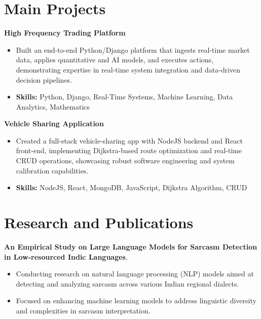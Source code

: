 \documentclass[a4paper,11pt]{article}
\begin{document}
\section{\textbf{Main Projects}}

\vspace{1mm}
  \textbf{High Frequency Trading Platform  }
\vspace{-1.5mm} %
\begin{itemize}
  \item Built an end-to-end Python/Django platform that ingests real-time market data, applies quantitative and AI models, and executes actions, demonstrating expertise in real-time system integration and data-driven decision pipelines.
\vspace{-3mm}
  \item \textbf{Skills:} Python, Django, Real-Time Systems, Machine Learning, Data Analytics, Mathematics
\end{itemize}


\vspace{1mm}
   \textbf{Vehicle Sharing Application }
\vspace{-1.5mm} %
\begin{itemize}
  \item Created a full-stack vehicle-sharing app with NodeJS backend and React front-end, implementing Dijkstra-based route optimization and real-time CRUD operations, showcasing robust software engineering and system calibration capabilities.
\vspace{-3mm}
  \item \textbf{Skills:} NodeJS, React, MongoDB, JavaScript, Dijkstra Algorithm, CRUD
\end{itemize}



\section{\textbf{Research and Publications} \hfill }
\vspace{1mm}
  \textbf{An Empirical Study on Large Language Models for Sarcasm Detection in Low-resourced Indic Languages}.
\vspace{-1mm} %
\begin{itemize}
  \item Conducting research on natural language processing (NLP) models aimed at detecting and analyzing sarcasm across various Indian regional dialects.
\vspace{-3mm}
  \item Focused on enhancing machine learning models to address linguistic diversity and complexities in sarcasm interpretation.
\end{itemize}
\end{document}
